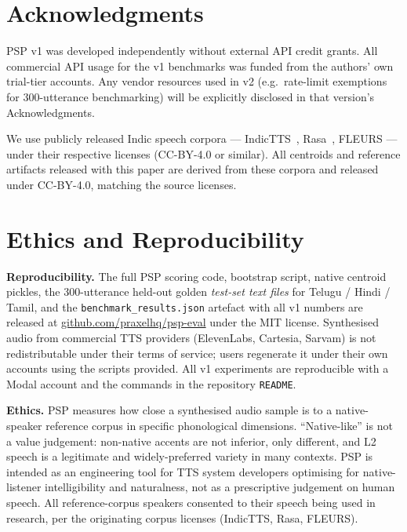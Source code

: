 \documentclass[conference,a4paper]{IEEEtran}
\newcommand{\psp}{\textsc{PSP}}
\begin{document}
\section*{Acknowledgments}

PSP v1 was developed independently without external API credit grants. All commercial API usage for the v1 benchmarks was funded from the authors' own trial-tier accounts. Any vendor resources used in v2 (e.g.\ rate-limit exemptions for 300-utterance benchmarking) will be explicitly disclosed in that version's Acknowledgments.

We use publicly released Indic speech corpora --- IndicTTS~\cite{kumar2022indictts}, Rasa~\cite{ai4bharat2023rasa}, FLEURS --- under their respective licenses (CC-BY-4.0 or similar). All centroids and reference artifacts released with this paper are derived from these corpora and released under CC-BY-4.0, matching the source licenses.

\section*{Ethics and Reproducibility}

\textbf{Reproducibility.} The full \psp{} scoring code, bootstrap script, native centroid pickles, the 300-utterance held-out golden \emph{test-set text files} for Telugu / Hindi / Tamil, and the \texttt{benchmark\_results.json} artefact with all v1 numbers are released at \url{github.com/praxelhq/psp-eval} under the MIT license. Synthesised audio from commercial TTS providers (ElevenLabs, Cartesia, Sarvam) is not redistributable under their terms of service; users regenerate it under their own accounts using the scripts provided. All v1 experiments are reproducible with a Modal account and the commands in the repository \texttt{README}.

\textbf{Ethics.} \psp{} measures how close a synthesised audio sample is to a native-speaker reference corpus in specific phonological dimensions. ``Native-like'' is not a value judgement: non-native accents are not inferior, only different, and L2 speech is a legitimate and widely-preferred variety in many contexts. \psp{} is intended as an engineering tool for TTS system developers optimising for native-listener intelligibility and naturalness, not as a prescriptive judgement on human speech. All reference-corpus speakers consented to their speech being used in research, per the originating corpus licenses (IndicTTS, Rasa, FLEURS).



\end{document}
